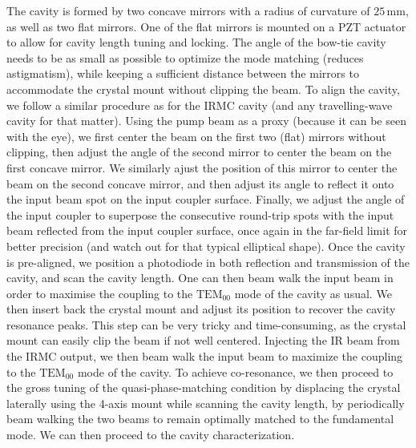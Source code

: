 The cavity is formed by two concave mirrors with a radius of curvature of $25\,\mathrm{mm}$, as well as two flat mirrors. One of the flat mirrors is mounted on a PZT actuator to allow for cavity length tuning and locking. The angle of the bow-tie cavity needs to be as small as possible to optimize the mode matching (reduces astigmatism), while keeping a sufficient distance between the mirrors to accommodate the crystal mount without clipping the beam. To align the cavity, we follow a similar procedure as for the IRMC cavity (and any travelling-wave cavity for that matter). Using the pump beam as a proxy (because it can be seen with the eye), we first center the beam on the first two (flat) mirrors without clipping, then adjust the angle of the second mirror to center the beam on the first concave mirror. We similarly ajust the position of this mirror to center the beam on the second concave mirror, and then adjust its angle to reflect it onto the input beam spot on the input coupler surface. Finally, we adjust the angle of the input coupler to superpose the consecutive round-trip spots with the input beam reflected from the input coupler surface, once again in the far-field limit for better precision (and watch out for that typical elliptical shape). Once the cavity is pre-aligned, we position a photodiode in both reflection and transmission of the cavity, and scan the cavity length. One can then beam walk the input beam in order to maximise the coupling to the $\text{TEM}_{00}$ mode of the cavity as usual. We then insert back the crystal mount and adjust its position to recover the cavity resonance peaks. This step can be very tricky and time-consuming, as the crystal mount can easily clip the beam if not well centered. Injecting the IR beam from the IRMC output, we then beam walk the input beam to maximize the coupling to the $\text{TEM}_{00}$ mode of the cavity. To achieve co-resonance, we then proceed to the gross tuning of the quasi-phase-matching condition by displacing the crystal laterally using the 4-axis mount while scanning the cavity length, by periodically beam walking the two beams to remain optimally matched to the fundamental mode. We can then proceed to the cavity characterization. \\


